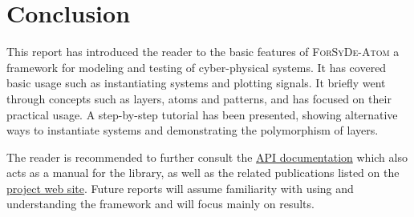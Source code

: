 \section{Conclusion}
\label{sec:getting-started:getting-started:conclusion}

This report has introduced the reader to the basic features of \textsc{ForSyDe-Atom} a framework for modeling and testing of cyber-physical systems. It has covered basic usage such as instantiating systems and plotting signals. It briefly went through concepts such as layers, atoms and patterns, and has focused on their practical usage. A step-by-step tutorial has been presented, showing alternative ways to instantiate systems and demonstrating the polymorphism of layers.

The reader is recommended to further consult the \href{\contentsurl}{API documentation} which also acts as a manual for the library, as well as the related publications listed on the \href{https://github.com/forsyde/forsyde-atom}{project web site}. Future reports will assume familiarity with using and understanding the framework and will focus mainly on results. 


